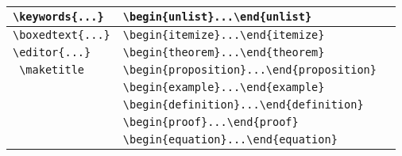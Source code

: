 \documentclass{article}
\begin{document}
\begin{center}
\begin{tabular}{|l|l|l|}
\verb+\keywords{...}+&  \verb+\begin{unlist}...\end{unlist}+&    \\\hline
\verb+\boxedtext{...}+&   \verb+\begin{itemize}...\end{itemize}+&  \\\hline
\verb+\editor{...}+&      \verb+\begin{theorem}...\end{theorem}+&  \\\hline
\verb+ \maketitle+&     \verb+\begin{proposition}...\end{proposition}+&    \\\hline
 &      \verb+\begin{example}...\end{example}+&    \\\hline
 &      \verb+\begin{definition}...\end{definition}+&    \\\hline
 &      \verb+\begin{proof}...\end{proof}+&      \\\hline
&       \verb+\begin{equation}...\end{equation}+&        \\
\hline
\end{tabular}\end{center}
\end{document}
